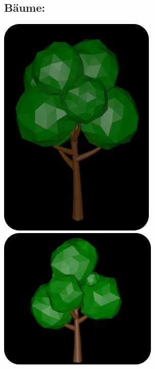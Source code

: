 \documentclass[paper=a4,fontsize=12pt,ngerman]{scrartcl}
\begin{document}
	\subsection*{Bäume:}
	\includegraphics*[scale=0.6]{graphics/Ali1.png}
	\includegraphics*[scale=0.9]{graphics/Ali2.png}
\end{document}

